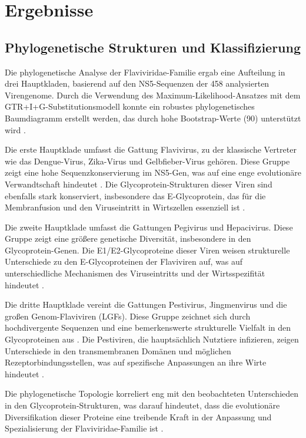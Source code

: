 \chapter{Ergebnisse} \label{chap:ergebnisse}

\section{Phylogenetische Strukturen und Klassifizierung} \label{sec:phylogenetische-strukturen}

Die phylogenetische Analyse der Flaviviridae-Familie ergab eine Aufteilung in drei Hauptkladen, basierend auf den NS5-Sequenzen der 458 analysierten Virengenome. Durch die Verwendung des Maximum-Likelihood-Ansatzes mit dem GTR+I+G-Substitutionsmodell konnte ein robustes phylogenetisches Baumdiagramm erstellt werden, das durch hohe Bootstrap-Werte (\text{\>}90\text{\%}) unterstützt wird \autocite{mifsudMappingGlycoproteinStructure2024}.

Die erste Hauptklade umfasst die Gattung Flavivirus, zu der klassische Vertreter wie das Dengue-Virus, Zika-Virus und Gelbfieber-Virus gehören. Diese Gruppe zeigt eine hohe Sequenzkonservierung im NS5-Gen, was auf eine enge evolutionäre Verwandtschaft hindeutet \autocite{Kuno2007}. Die Glycoprotein-Strukturen dieser Viren sind ebenfalls stark konserviert, insbesondere das E-Glycoprotein, das für die Membranfusion und den Viruseintritt in Wirtszellen essenziell ist \autocite{Rey1995}.

Die zweite Hauptklade umfasst die Gattungen Pegivirus und Hepacivirus. Diese Gruppe zeigt eine größere genetische Diversität, insbesondere in den Glycoprotein-Genen. Die E1/E2-Glycoproteine dieser Viren weisen strukturelle Unterschiede zu den E-Glycoproteinen der Flaviviren auf, was auf unterschiedliche Mechanismen des Viruseintritts und der Wirtsspezifität hindeutet \autocite{Vieyres2013}.

Die dritte Hauptklade vereint die Gattungen Pestivirus, Jingmenvirus und die großen Genom-Flaviviren (LGFs). Diese Gruppe zeichnet sich durch hochdivergente Sequenzen und eine bemerkenswerte strukturelle Vielfalt in den Glycoproteinen aus \autocite{shangCrystalStructureCapsid2018}. Die Pestiviren, die hauptsächlich Nutztiere infizieren, zeigen Unterschiede in den transmembranen Domänen und möglichen Rezeptorbindungsstellen, was auf spezifische Anpassungen an ihre Wirte hindeutet \autocite{Tautz2015}.

Die phylogenetische Topologie korreliert eng mit den beobachteten Unterschieden in den Glycoprotein-Strukturen, was darauf hindeutet, dass die evolutionäre Diversifikation dieser Proteine eine treibende Kraft in der Anpassung und Spezialisierung der Flaviviridae-Familie ist \autocite{mifsudMappingGlycoproteinStructure2024}.

